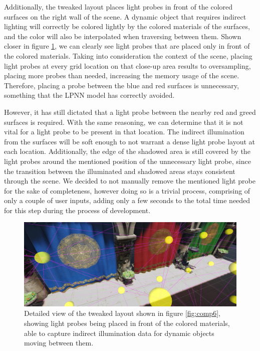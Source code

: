 Additionally, the tweaked layout places light probes in front of the colored surfaces on the right wall of the scene. A dynamic object that requires indirect lighting will correctly be colored lightly by the colored materials of the surfaces, and the color will also be interpolated when traversing between them. Shown closer in figure \ref{fig:sponza_detail}, we can clearly see light probes that are placed only in front of the colored materials. Taking into consideration the context of the scene, placing light probes at every grid location on that close-up area results to oversampling, placing more probes than needed, increasing the memory usage of the scene. Therefore, placing a probe between the blue and red surfaces is unnecessary, something that the LPNN model has correctly avoided. 

However, it has still dictated that a light probe between the nearby red and greed surfaces is required. With the same reasoning, we can determine that it is not vital for a light probe to be present in that location. The indirect illumination from the surfaces will be soft enough to not warrant a dense light probe layout at each location. Additionally, the edge of the shadowed area is still covered by the light probes around the mentioned position of the unnecessary light probe, since the transition between the illuminated and shadowed areas stays consistent through the scene. We decided to not manually remove the mentioned light probe for the sake of completeness, however doing so is a trivial process, comprising of only a couple of user inputs, adding only a few seconds to the total time needed for this step during the process of development.

\begin{figure}[H]
	\centering
	\includegraphics[width=\linewidth]{Graphics/results/sponza_0.4_2_C.jpg}
	\caption{Detailed view of the tweaked layout shown in figure \ref{fig:comp6}, showing light probes being placed in front of the colored materials, able to capture indirect illumination data for dynamic objects moving between them.}
	\label{fig:sponza_detail}
\end{figure}

